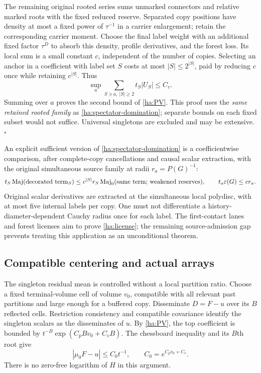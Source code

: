 The remaining original rooted series sums unmarked connectors and
relative marked roots with the fixed reduced reserve.  Separated copy
positions have density at most a fixed power of $\tau^{-1}$ in a
carrier enlargement; retain the corresponding carrier moment.  Choose
the final label weight with an additional fixed factor $\tau^D$ to
absorb this density, profile derivatives, and the forest loss.
Its local sum is a small constant $c$, independent of the number of
copies.  Selecting an anchor in a coefficient with label set $S$ costs
at most $|S|\leq2^{|S|}$, paid by reducing $c$ once while retaining
$c^{|S|}$.  Thus
\begin{equation}
 \sup_a\sum_{S\ni a,\ |S|\geq2}t_S|U_S|\leq C_v.
 \label{ha:rooted-vacuum}
\end{equation}
Summing over $a$ proves the second bound of \eqref{ha:PV}.  This proof
uses the \emph{same retained rooted family} as
\eqref{ha:spectator-domination}; separate bounds on each fixed subset
would not suffice.  Universal singletons are excluded and may be
extensive. \hfill$\square$

An explicit sufficient version of \eqref{ha:spectator-domination} is a
coefficientwise comparison, after complete-copy cancellations and causal
scalar extraction, with the original simultaneous source family at
radii $r_a=P(G)^{-1}$:
\begin{equation}
 t_S\operatorname{Maj}(\hbox{decorated term}_S)
 \leq c^{|S|}r_S\operatorname{Maj}_0
                       (\hbox{same term; weakened reserves}),
 \qquad t_a\varepsilon(G)\leq cr_a.
 \label{ha:license}
\end{equation}
Original scalar derivatives are extracted at the simultaneous local
polydisc, with at most five internal labels per copy.  One must not
differentiate a history-diameter-dependent Cauchy radius once for each
label.  The first-contact lanes and forest licenses aim to prove
\eqref{ha:license}; the remaining source-admission gap prevents treating
this application as an unconditional theorem.

\subsection{Compatible centering and actual arrays}

The singleton residual mean is controlled without a local partition
ratio.  Choose a fixed terminal-volume cell of volume $v_0$, compatible
with all relevant past partitions and large enough for a buffered copy.
Disseminate $D=F-u$ over its $B$ reflected cells.  Restriction consistency
and compatible covariance identify the singleton scalars as the
disseminates of $u$.  By \eqref{ha:PV}, the top coefficient is bounded by
$t^{-B}\exp(C_pBv_0+C_vB)$.  The chessboard inequality and its $B$th
root give
\begin{equation}
 |\mu_0F-u|\leq C_0t^{-1},\qquad C_0=e^{C_pv_0+C_v}.
 \label{ha:residual-mean}
\end{equation}
There is no zero-free logarithm of $H$ in this argument.

